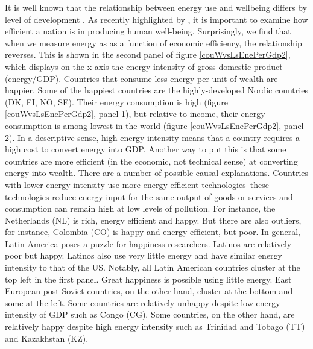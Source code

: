 \documentclass[10pt, letterpaper]{article}
\begin{document}
\begin{spacing}{1.5}
It is well known that the relationship between energy use and wellbeing differs
by level of development \citep[e.g.,][]{jorgenson15b,knight11}.
As recently highlighted by \citet{dietz09}, it is important to examine
how efficient a nation is in  producing human well-being.
%
Surprisingly,  we find that when we measure energy as as a function of economic
efficiency, the relationship reverses.  This is shown in the second panel of
figure \ref{couWvsLsEnePerGdp2}, which displays on the x axis the energy intensity of gross domestic product (energy/GDP). Countries that consume less energy per unit of wealth are happier. 
%
Some of the happiest countries are the highly-developed
Nordic countries (DK, FI, NO, SE). Their energy consumption is high (figure
\ref{couWvsLsEnePerGdp2}, panel 1), but relative to income, their energy
consumption is among lowest in the world (figure \ref{couWvsLsEnePerGdp2}, panel 2).
%
In a descriptive sense, high energy intensity means that a country requires
a high cost to convert energy into GDP. Another way to put this is that some
countries are more efficient (in the economic, not technical sense) at
converting energy into wealth. There are a number of possible causal explanations.  Countries with lower energy intensity  use
 more energy-efficient technologies--these technologies reduce energy input 
for the same output of goods or services and consumption can remain high at low
levels of pollution.
 For instance,  the Netherlands (NL) is rich,  energy efficient and happy. But
 there are also outliers, for instance,  Colombia (CO) is  happy and energy
 efficient,  but poor.  
In general, Latin America poses a puzzle for happiness researchers. Latinos are
relatively poor but happy. Latinos also use very little  energy and have similar energy intensity to that of the  US. Notably, all Latin
 American countries cluster at the top left in the
first panel.  Great happiness is possible using little  energy. East European
post-Soviet countries, on the other hand, cluster at the bottom and some at the
left. Some countries are relatively unhappy despite low energy intensity of GDP such as Congo (CG). Some countries, on the other hand, are relatively happy
despite high energy intensity such as Trinidad and Tobago (TT) and Kazakhstan (KZ).    

\end{spacing}
\end{document}
